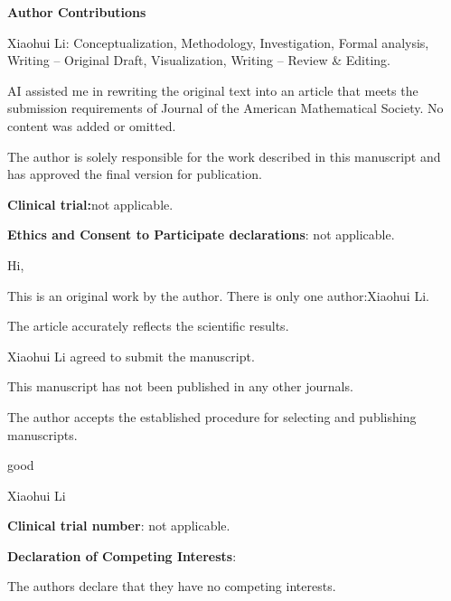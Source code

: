 \documentclass[11pt,a4paper]{article}
\begin{document}
 \textbf{\textbf{Author Contributions}}

Xiaohui Li: Conceptualization, Methodology, Investigation, Formal analysis, Writing – Original Draft, Visualization, Writing – Review \& Editing.

AI assisted me in rewriting the original text into an article that meets the submission requirements of Journal of the American Mathematical Society. No content was added or omitted.

 The author is solely responsible for the work described in this manuscript and has approved the final version for publication.

 \textbf{\textbf{Clinical trial:}}not applicable.

 \textbf{\textbf{Ethics and Consent to Participate declarations}}: not applicable.

 Hi,

This is an original work by the author. There is only one author:Xiaohui Li.

The article accurately reflects the scientific results.

Xiaohui Li agreed to submit the manuscript.

This manuscript has not been published in any other journals.

The author accepts the established procedure for selecting and publishing manuscripts.

good

Xiaohui Li



 \textbf{\textbf{Clinical trial number}}: not applicable.
 
 \textbf{\textbf{Declaration of Competing Interests}}: 

The authors declare that they have no competing interests.
\end{document}
